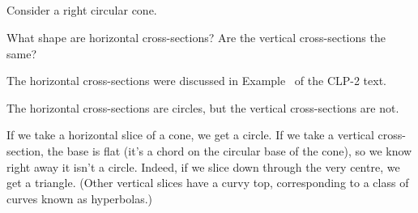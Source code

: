 %
%

\subsection*{\Conceptual}
\begin{question}
Consider a right circular cone.
\begin{center}
\end{center}
What shape are horizontal cross-sections? Are the vertical cross-sections the same?
\end{question}
\begin{hint}
The horizontal cross-sections were discussed in Example~ of
the CLP-2 text.
\end{hint}
\begin{answer}
The horizontal cross-sections are circles, but the vertical cross-sections are not.
\end{answer}
\begin{solution}
If we take a horizontal slice of a cone, we get a circle. If we take a vertical cross-section, the base is flat (it's a chord on the circular base of the cone), so we know right away it isn't a circle. Indeed, if we slice down through the very centre, we get a triangle. (Other vertical slices have a curvy top, corresponding to  a class of curves known as hyperbolas.)
\end{solution}


